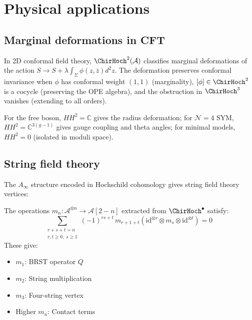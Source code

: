 \section{Physical applications}

\subsection{Marginal deformations in CFT}

In 2D conformal field theory, $\ChirHoch^2(\mathcal{A})$ classifies marginal deformations of the action
$S \to S + \lambda \int_{\Sigma} \phi(z,\bar{z}) d^2z$.
The deformation preserves conformal invariance when $\phi$ has conformal weight $(1,1)$ (marginality), $[\phi] \in \ChirHoch^2$ is a cocycle (preserving the OPE algebra), and the obstruction in $\ChirHoch^3$ vanishes (extending to all orders).

\begin{example}
For the free boson, $HH^2 = \mathbb{C}$ gives the radius deformation; for $\mathcal{N}=4$ SYM, $HH^2 = \mathbb{C}^{3(g-1)}$ gives gauge coupling and theta angles; for minimal models, $HH^2 = 0$ (isolated in moduli space).
\end{example}

\subsection{String field theory}

The $A_{\infty}$ structure encoded in Hochschild cohomology gives string field theory vertices:

\begin{theorem}\label{thm:string-field-theory-hochschild}
The operations $m_n: \mathcal{A}^{\otimes n} \to \mathcal{A}[2-n]$ extracted from $\ChirHoch^{\bullet}$ satisfy:
\[
\sum_{\substack{r+s+t=n \\ r,t \geq 0,\; s \geq 1}} (-1)^{rs+t}\, m_{r+1+t}(\mathrm{id}^{\otimes r} \otimes m_s \otimes \mathrm{id}^{\otimes t}) = 0
\]
These give:
\begin{itemize}
\item $m_1$: BRST operator $Q$
\item $m_2$: String multiplication
\item $m_3$: Four-string vertex
\item Higher $m_n$: Contact terms
\end{itemize}
\end{theorem}

